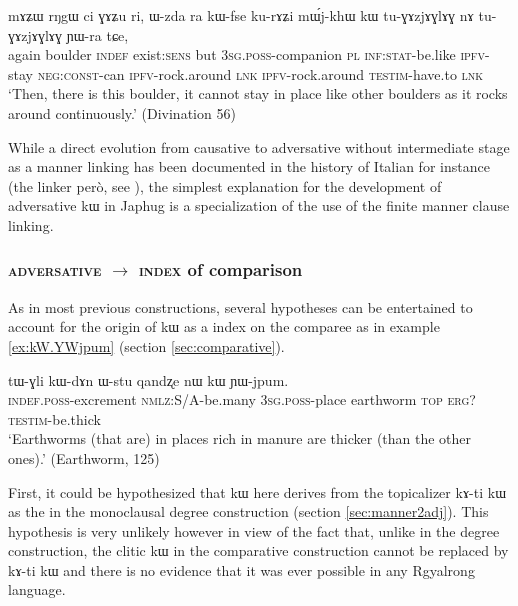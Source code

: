 \documentclass[oldfontcommands,oneside,a4paper,11pt]{article}
\newcommand{\ipa}[1]{{\phon #1}} %
\begin{document}
 \begin{exe}
\ex \label{ex:tuGAzjAGlAG}
\gll  
    \ipa{mɤʑɯ}  	\ipa{rŋgɯ}  	\ipa{ci}  	\ipa{ɣɤʑu}  	\ipa{ri,}  	\ipa{ɯ-zda}  	\ipa{ra}  	\ipa{kɯ-fse}  	\ipa{ku-rɤʑi}  	\ipa{mɯ́j-khɯ}  	\ipa{kɯ}  	\ipa{tu-ɣɤzjɤɣlɤɣ}  	\ipa{nɤ}  	\ipa{tu-ɣɤzjɤɣlɤɣ}  	\ipa{ɲɯ-ra}  	\ipa{tɕe,}  \\
    again boulder \textsc{indef} exist:\textsc{sens} but \textsc{3sg.poss}-companion \textsc{pl} \textsc{inf:stat}-be.like \textsc{ipfv}-stay \textsc{neg:const}-can \textsc{ipfv}-rock.around \textsc{lnk} \textsc{ipfv}-rock.around  \textsc{testim}-have.to \textsc{lnk}     \\
   \glt `Then, there is this boulder, it cannot stay in place like other boulders as it rocks around continuously.' (Divination  56)
 \end{exe}
 
 While a direct evolution from causative to adversative without intermediate stage as a manner linking has been documented in the history of Italian for instance (the linker \ipa{però}, see  \citealt{mauri12adversative}), the simplest explanation for the development of adversative \ipa{kɯ} in Japhug is a specialization of the use of the finite manner clause linking.
 
 
 
  \subsubsection{\textsc{adversative} $\rightarrow$ \textsc{index} of comparison}
  As in most previous constructions, several hypotheses can be entertained to account for the origin of \ipa{kɯ} as a index on the comparee as in example \ref{ex:kW.YWjpum}  (section \ref{sec:comparative}).
  
        \begin{exe}
  \ex  \label{ex:kW.YWjpum}  
  \gll 
  \ipa{tɯ-ɣli} 	\ipa{kɯ-dɤn} 	\ipa{ɯ-stu} 	\ipa{qandʐe} 	\ipa{nɯ} 	\ipa{kɯ} 	\ipa{ɲɯ-jpum.} \\
  \textsc{indef.poss}-excrement \textsc{nmlz}:S/A-be.many \textsc{3sg.poss}-place earthworm \textsc{top} \textsc{erg?} \textsc{testim}-be.thick   \\
  \glt `Earthworms (that are) in places rich in manure are thicker (than the other ones).'
   (Earthworm, 125)
   \end{exe} 

  First, it could be hypothesized that \ipa{kɯ} here derives from the topicalizer \ipa{kɤ-ti kɯ}  as the in the monoclausal degree construction (section \ref{sec:manner2adj}). This hypothesis is very unlikely however in view of the fact that, unlike in the degree construction, the clitic \ipa{kɯ} in the comparative construction cannot be replaced by \ipa{kɤ-ti kɯ} and there is no evidence that it was ever  possible in any Rgyalrong language.
  
\end{document}
